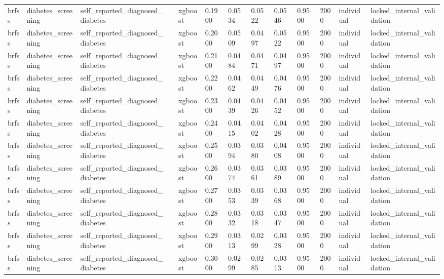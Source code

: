 \begin{tabular}{lllllllllllll}
brfss & diabetes\_screening & self\_reported\_diagnosed\_diabetes &  & xgboost & 0.1900 & 0.0534 & 0.0522 & 0.0546 & 0.9500 & 2000 & individual & locked\_internal\_validation \\
brfss & diabetes\_screening & self\_reported\_diagnosed\_diabetes &  & xgboost & 0.2000 & 0.0509 & 0.0497 & 0.0522 & 0.9500 & 2000 & individual & locked\_internal\_validation \\
brfss & diabetes\_screening & self\_reported\_diagnosed\_diabetes &  & xgboost & 0.2100 & 0.0484 & 0.0471 & 0.0497 & 0.9500 & 2000 & individual & locked\_internal\_validation \\
brfss & diabetes\_screening & self\_reported\_diagnosed\_diabetes &  & xgboost & 0.2200 & 0.0462 & 0.0449 & 0.0476 & 0.9500 & 2000 & individual & locked\_internal\_validation \\
brfss & diabetes\_screening & self\_reported\_diagnosed\_diabetes &  & xgboost & 0.2300 & 0.0439 & 0.0426 & 0.0452 & 0.9500 & 2000 & individual & locked\_internal\_validation \\
brfss & diabetes\_screening & self\_reported\_diagnosed\_diabetes &  & xgboost & 0.2400 & 0.0415 & 0.0402 & 0.0428 & 0.9500 & 2000 & individual & locked\_internal\_validation \\
brfss & diabetes\_screening & self\_reported\_diagnosed\_diabetes &  & xgboost & 0.2500 & 0.0394 & 0.0380 & 0.0408 & 0.9500 & 2000 & individual & locked\_internal\_validation \\
brfss & diabetes\_screening & self\_reported\_diagnosed\_diabetes &  & xgboost & 0.2600 & 0.0374 & 0.0361 & 0.0389 & 0.9500 & 2000 & individual & locked\_internal\_validation \\
brfss & diabetes\_screening & self\_reported\_diagnosed\_diabetes &  & xgboost & 0.2700 & 0.0353 & 0.0339 & 0.0368 & 0.9500 & 2000 & individual & locked\_internal\_validation \\
brfss & diabetes\_screening & self\_reported\_diagnosed\_diabetes &  & xgboost & 0.2800 & 0.0332 & 0.0318 & 0.0347 & 0.9500 & 2000 & individual & locked\_internal\_validation \\
brfss & diabetes\_screening & self\_reported\_diagnosed\_diabetes &  & xgboost & 0.2900 & 0.0313 & 0.0299 & 0.0328 & 0.9500 & 2000 & individual & locked\_internal\_validation \\
brfss & diabetes\_screening & self\_reported\_diagnosed\_diabetes &  & xgboost & 0.3000 & 0.0299 & 0.0285 & 0.0313 & 0.9500 & 2000 & individual & locked\_internal\_validation \\

\end{tabular}
